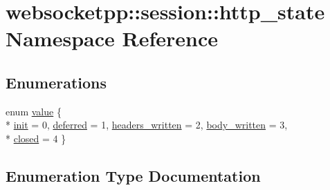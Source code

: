 \hypertarget{namespacewebsocketpp_1_1session_1_1http__state}{}\section{websocketpp\+:\+:session\+:\+:http\+\_\+state Namespace Reference}
\label{namespacewebsocketpp_1_1session_1_1http__state}
\subsection*{Enumerations}
\begin{DoxyCompactItemize}
\item 
enum \hyperlink{namespacewebsocketpp_1_1session_1_1http__state_a40c0c92e8a4a3dff1ecd017d26f0bc4a}{value} \{ \\*
\hyperlink{namespacewebsocketpp_1_1session_1_1http__state_a40c0c92e8a4a3dff1ecd017d26f0bc4aa6bd556366b4fcf3745506f7d8b0979ad}{init} = 0, 
\hyperlink{namespacewebsocketpp_1_1session_1_1http__state_a40c0c92e8a4a3dff1ecd017d26f0bc4aa93b52fb34c5d01e7349ef0f4e80b94d5}{deferred} = 1, 
\hyperlink{namespacewebsocketpp_1_1session_1_1http__state_a40c0c92e8a4a3dff1ecd017d26f0bc4aa8c2aa0b669ba6e5923b8cd81e955344e}{headers\+\_\+written} = 2, 
\hyperlink{namespacewebsocketpp_1_1session_1_1http__state_a40c0c92e8a4a3dff1ecd017d26f0bc4aac7c8a63a09d8d1a407bbe298db652b9b}{body\+\_\+written} = 3, 
\\*
\hyperlink{namespacewebsocketpp_1_1session_1_1http__state_a40c0c92e8a4a3dff1ecd017d26f0bc4aa265eaa7a81d94731c9f4e048df62f104}{closed} = 4
 \}
\end{DoxyCompactItemize}


\subsection{Enumeration Type Documentation}
\hypertarget{namespacewebsocketpp_1_1session_1_1http__state_a40c0c92e8a4a3dff1ecd017d26f0bc4a}{}
